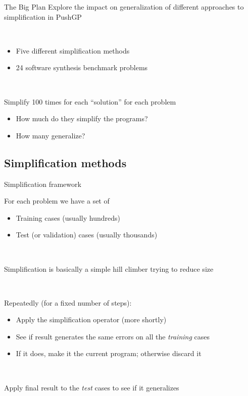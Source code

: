 \documentclass{beamer}
\begin{document}
\begin{frame}{The Big Plan}
Explore the impact on generalization of different approaches to simplification in PushGP 

~

\begin{itemize}
	\item Five different simplification methods
	\item 24 software synthesis benchmark problems
\end{itemize}

~ 

Simplify 100 times for each ``solution'' for each problem
\begin{itemize}
	\item How much do they simplify the programs?
	\item How many generalize?
\end{itemize} 

\end{frame}

\subsection{Simplification methods}

\begin{frame}{Simplification framework}

For each problem we have a set of
\begin{itemize}
	\item Training cases (usually hundreds)
	\item Test (or validation) cases (usually thousands)
\end{itemize}

~

Simplification is basically a simple hill climber trying to reduce size

~

Repeatedly (for a fixed number of steps):
\begin{itemize}
	\item Apply the simplification operator (more shortly)
	\item See if result generates the same errors on all the \emph{training} cases
	\item If it does, make it the current program; otherwise discard it
\end{itemize}

~

Apply final result to the \emph{test} cases to see if it generalizes

\end{frame}
\end{document}
